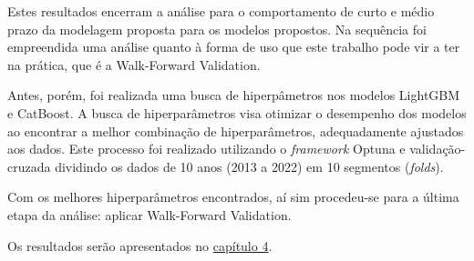 Estes resultados encerram a análise para o comportamento de curto e médio prazo da modelagem proposta para os modelos propostos. Na sequência foi empreendida uma análise quanto à forma de uso que este trabalho pode vir a ter na prática, que é a Walk-Forward Validation.

Antes, porém, foi realizada uma busca de hiperpâmetros nos modelos LightGBM e CatBoost. A busca de hiperparâmetros visa otimizar o desempenho dos modelos ao encontrar a melhor combinação de hiperparâmetros, adequadamente ajustados aos dados. Este processo foi realizado utilizando o \textit{framework} Optuna e validação-cruzada dividindo os dados de 10 anos (2013 a 2022) em 10 segmentos (\textit{folds}).\cite{akiba2019optuna}\cite{optuna_docs}\cite{skforecast}

Com os melhores hiperparâmetros encontrados, aí sim procedeu-se para a última etapa da análise: aplicar Walk-Forward Validation.

Os resultados serão apresentados no \hyperref[cap:capitulo4]{capítulo 4}.
\clearpage

